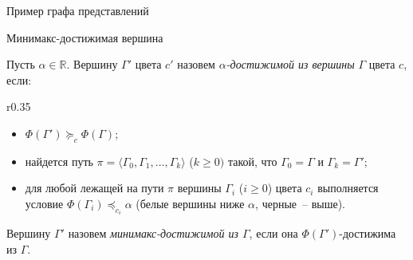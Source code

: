 \documentclass{beamer}
\begin{document}
\begin{frame}{Пример графа представлений}


\showPosGraph


\vspace{1cm}

\end{frame}


\begin{frame}{Минимакс-достижимая вершина}

Пусть $\alpha\in\mathbb{R}$. Вершину $\Gamma'$ цвета $c'$ назовем \emph{$\alpha$-достижимой из вершины} $\Gamma$ цвета $c$, если:
\begin{wrapfigure}[6]{r}{0.35\linewidth} 
  \vspace{-4.8ex}
\end{wrapfigure}  
%
\vspace{-0.3cm}
\begin{itemize}
\item $\Phi(\Gamma') \succcurlyeq_{c} \Phi(\Gamma)$;
\item найдется путь $\pi=\langle \Gamma_0,\Gamma_1,\ldots,\Gamma_k\rangle$ ($k\geqslant 0)$ такой, что $\Gamma_0=\Gamma$ и $\Gamma_k=\Gamma'$;
\item для любой лежащей на пути $\pi$ вершины $\Gamma_i$  ($i \geqslant 0$) цвета $c_i$ выполняется условие 
$\Phi(\Gamma_i) \preccurlyeq_{c_i} \alpha$ (белые вершины ниже $\alpha$, черные~-- выше).
\end{itemize}

Вершину $\Gamma'$ назовем \emph{минимакс-достижимой из $\Gamma$}, если она $\Phi(\Gamma')$-достижима из $\Gamma$.
\end{frame}
\end{document}

